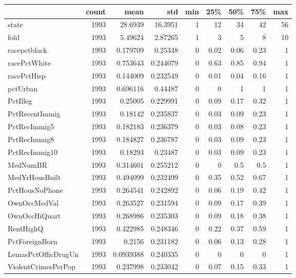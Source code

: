 \documentclass{article}
\begin{document}
\begin{table}[h!]
    \centering
    \begin{tabular}{lrrrrrrrr}
        \hline
                            & count & mean      & std      & min & 25\% & 50\% & 75\% & max \\
        \hline
        state               & 1993  & 28.6939   & 16.3951  & 1   & 12   & 34   & 42   & 56  \\
        fold                & 1993  & 5.49624   & 2.87265  & 1   & 3    & 5    & 8    & 10  \\
        racepctblack        & 1993  & 0.179709  & 0.25348  & 0   & 0.02 & 0.06 & 0.23 & 1   \\
        racePctWhite        & 1993  & 0.753643  & 0.244079 & 0   & 0.63 & 0.85 & 0.94 & 1   \\
        racePctHisp         & 1993  & 0.144009  & 0.232549 & 0   & 0.01 & 0.04 & 0.16 & 1   \\
        pctUrban            & 1993  & 0.696116  & 0.44487  & 0   & 0    & 1    & 1    & 1   \\
        PctIlleg            & 1993  & 0.25005   & 0.229991 & 0   & 0.09 & 0.17 & 0.32 & 1   \\
        PctRecentImmig      & 1993  & 0.18142   & 0.235837 & 0   & 0.03 & 0.09 & 0.23 & 1   \\
        PctRecImmig5        & 1993  & 0.182183  & 0.236379 & 0   & 0.03 & 0.08 & 0.23 & 1   \\
        PctRecImmig8        & 1993  & 0.184827  & 0.236787 & 0   & 0.03 & 0.09 & 0.23 & 1   \\
        PctRecImmig10       & 1993  & 0.18293   & 0.23487  & 0   & 0.03 & 0.09 & 0.23 & 1   \\
        MedNumBR            & 1993  & 0.314601  & 0.255212 & 0   & 0    & 0.5  & 0.5  & 1   \\
        MedYrHousBuilt      & 1993  & 0.494099  & 0.232499 & 0   & 0.35 & 0.52 & 0.67 & 1   \\
        PctHousNoPhone      & 1993  & 0.264541  & 0.242892 & 0   & 0.06 & 0.19 & 0.42 & 1   \\
        OwnOccMedVal        & 1993  & 0.263527  & 0.231594 & 0   & 0.09 & 0.17 & 0.39 & 1   \\
        OwnOccHiQuart       & 1993  & 0.268986  & 0.235303 & 0   & 0.09 & 0.18 & 0.38 & 1   \\
        RentHighQ           & 1993  & 0.422985  & 0.248346 & 0   & 0.22 & 0.37 & 0.59 & 1   \\
        PctForeignBorn      & 1993  & 0.2156    & 0.231182 & 0   & 0.06 & 0.13 & 0.28 & 1   \\
        LemasPctOfficDrugUn & 1993  & 0.0939388 & 0.240335 & 0   & 0    & 0    & 0    & 1   \\
        ViolentCrimesPerPop & 1993  & 0.237998  & 0.233042 & 0   & 0.07 & 0.15 & 0.33 & 1   \\
        \hline
    \end{tabular}
\end{table}
\end{document}
